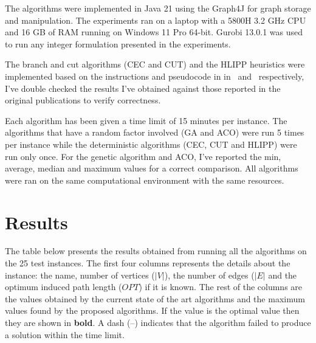 The algorithms were implemented in Java 21 using the Graph4J for graph storage and manipulation. The experiments ran on a laptop with a 5800H 3.2 GHz CPU and 16 GB of RAM running on Windows 11 Pro 64-bit. Gurobi 13.0.1 was used to run any integer formulation presented in the experiments.

The branch and cut algorithms (CEC and CUT) and the HLIPP heuristics were implemented based on the instructions and pseudocode in in~\cite{marzo2} and~\cite{marzo} respectively, I've double checked the results I've obtained against those reported in the original publications to verify correctness.

Each algorithm has been given a time limit of 15 minutes per instance. The algorithms that have a random factor involved (GA and ACO) were run 5 times per instance while the deterministic algorithms (CEC, CUT and HLIPP) were run only once. For the genetic algorithm and ACO, I've reported the min, average, median and maximum values for a correct comparison. All algorithms were ran on the same computational environment with the same resources.

\section{Results}\label{sec:results}

The table below presents the results obtained from running all the algorithms on the 25 test instances. The first four columns represents the details about the instance: the name, number of vertices (\(|V|\)), the number of edges (\(|E|\) and the optimum induced path length (\(OPT\)) if it is known. The rest of the columns are the values obtained by the current state of the art algorithms and the maximum values found by the proposed algorithms. If the value is the optimal value then they are shown in \textbf{bold}. A dash (--) indicates that the algorithm failed to produce a solution within the time limit.

